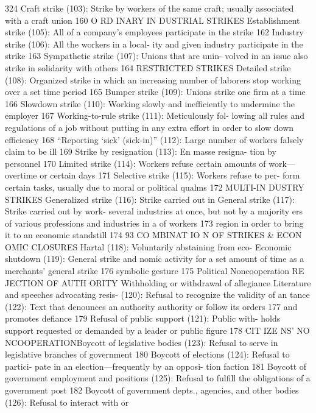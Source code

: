 \documentclass[twoside,a4paper,12pt,fleqn,openany]{extbook}
\begin{document}
 324
Craft strike (103): Strike by workers of the
same craft; usually associated with a craft
union
 160
O RD INARY IN DUSTRIAL STRIKES
Establishment strike (105): All of a company’s
employees participate in the strike
 162
Industry strike (106): All the workers in a local-
ity and given industry participate in the strike		
163
Sympathetic strike (107): Unions that are unin-
volved in an issue also strike in solidarity with
others
 164
RESTRICTED STRIKES
Detailed strike (108): Organized strike in which
an increasing number of laborers stop working
over a set time period
 165
Bumper strike (109): Unions strike one firm at
a time
 166
Slowdown strike (110): Working slowly and
inefficiently to undermine the employer 167
Working-to-rule strike (111): Meticulously fol-
lowing all rules and regulations of a job without
putting in any extra effort in order to slow down
efficiency
 168
“Reporting ‘sick’ (sick-in)” (112): Large number
of workers falsely claim to be ill
 169
Strike by resignation (113): En masse resigna-
tion by personnel
 170
Limited strike (114): Workers refuse certain
amounts of work—overtime or certain days 171
Selective strike (115): Workers refuse to per-
form certain tasks, usually due to moral or
political qualms
 172
MULTI-IN DUSTRY STRIKES
Generalized strike (116): Strike carried out in
 General strike (117): Strike carried out by work-
several industries at once, but not by a majority
 ers of various professions and industries in a
of workers
 173
 region in order to bring it to an economic
standstill
 174
93
CO MBINAT IO N OF STRIKES & ECON OMIC CLOSURES
Hartal (118): Voluntarily abstaining from eco-
 Economic shutdown (119): General strike and
nomic activity for a set amount of time as a
 merchants’ general strike
 176
symbolic gesture
 175
Political Noncooperation
RE JECTION OF AUTH ORITY
Withholding or withdrawal of allegiance
 Literature and speeches advocating resis-
(120): Refusal to recognize the validity of an
 tance (122): Text that denounces an authority
authority or follow its orders
 177
 and promotes defiance
 179
Refusal of public support (121): Public with-
holds support requested or demanded by a
leader or public figure
 178
CIT IZE NS’ NO NCOOPERATIONBoycott of legislative bodies (123): Refusal to
serve in legislative branches of government		
180
Boycott of elections (124): Refusal to partici-
pate in an election—frequently by an opposi-
tion faction
 181
Boycott of government employment and
positions (125): Refusal to fulfill the obligations
of a government post
 182
Boycott of government depts., agencies, and
other bodies (126): Refusal to interact with or
\end{document}
